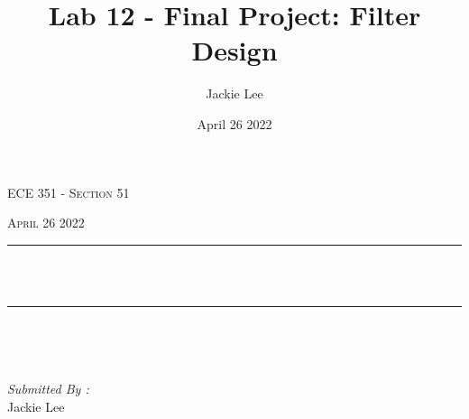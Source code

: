 \documentclass[12pt]{report}
\title{Lab 12 - Final Project: Filter Design}
\author{ Jackie Lee}
\date{April 26 2022}
\makeatletter
\let\thetitle\@title
\makeatother
\begin{document}

\begin{titlepage}
	\centering
    \vspace*{0.5 cm}
\begin{center}    \textsc{\Large   ECE 351 - Section 51 }\\[2.0 cm]	\end{center}%
	\textsc{\Large April 26 2022  }\\[0.5 cm]				%
	\rule{\linewidth}{0.2 mm} \\[0.4 cm]
	{ \huge \bfseries \thetitle}\\
	\rule{\linewidth}{0.2 mm} \\[1.5 cm]
	
	\begin{minipage}{0.4\textwidth}
		\begin{flushleft} \large
			\end{flushleft}
			\end{minipage}~
			\begin{minipage}{0.4\textwidth}
            
			\begin{flushright} \large
			\emph{Submitted By :} \\
			Jackie Lee  
		\end{flushright}
           
	\end{minipage}\\[2 cm]
	
    
    
    
    
	
\end{titlepage}


\tableofcontents
\pagebreak

\renewcommand{\thesection}{\arabic{section}}
\end{document}
